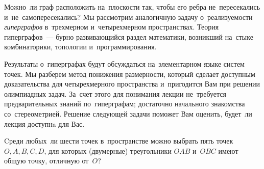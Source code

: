 



Можно~ли граф расположить на~плоскости так, чтобы его ребра не~пересекались
и~не~самопересекались?
Мы рассмотрим аналогичную задачу о~реализуемости \emph{гиперграфов}
в~трехмерном и~четырехмерном пространствах.
Теория гиперграфов~--- бурно развивающийся раздел математики, возникший
на~стыке комбинаторики, топологии и~программирования.

Результаты о~гиперграфах будут обсуждаться на~элементарном языке систем точек.
Мы разберем метод понижения размерности, который сделает доступным
доказательства для четырехмерного пространства и~пригодится Вам при решении
олимпиадных задач.
За~счет этого для понимания лекции
 не~требуется предварительных знаний по~гиперграфам;
 достаточно начального знакомства со~стереометрией.
Решение следующей задачи поможет Вам оценить, будет~ли лекция доступнa для Вас.

\smallskip
\begin{em}
Cреди любых~ли шести точек в~пространстве можно выбрать пять точек $O,A,B,C,D$,
для которых (двумерные) треугольники $OAB$  и~$OBC$ имеют общую точку, отличную
от~$O$?
\end{em}


